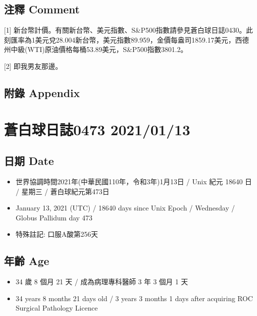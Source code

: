 \documentclass[a5paper, 10pt
]{book}
\providecommand{\tightlist}{%
  \setlength{\itemsep}{0pt}\setlength{\parskip}{0pt}}
\begin{document}
\hypertarget{ux6ce8ux91cb-comment-42}{%
\subsection{注釋 Comment}\label{ux6ce8ux91cb-comment-42}}

{[}1{]}
新台幣計價。有關新台幣、美元指數、S\&P500指數請參見蒼白球日誌0430。此刻匯率為1美元兌28.004新台幣，美元指數89.959，金價每盎司1859.17美元，西德州中級(WTI)原油價格每桶53.89美元，S\&P500指數3801.2。

{[}2{]} 即我男友那邊。

\hypertarget{ux9644ux9304-appendix-42}{%
\subsection{附錄 Appendix}\label{ux9644ux9304-appendix-42}}

\hypertarget{ux84bcux767dux7403ux65e5ux8a8c0473-20210113}{%
\section{蒼白球日誌0473
2021/01/13}\label{ux84bcux767dux7403ux65e5ux8a8c0473-20210113}}

\hypertarget{ux65e5ux671f-date-43}{%
\subsection{日期 Date}\label{ux65e5ux671f-date-43}}

\begin{itemize}
\tightlist
\item
  世界協調時間2021年(中華民國110年，令和3年)1月13日 / Unix 紀元 18640 日
  / 星期三 / 蒼白球紀元第473日
\item
  January 13, 2021 (UTC) / 18640 days since Unix Epoch / Wednesday /
  Globus Pallidum day 473
\item
  特殊註記: 口服A酸第256天
\end{itemize}

\hypertarget{ux5e74ux9f61-age-43}{%
\subsection{年齡 Age}\label{ux5e74ux9f61-age-43}}

\begin{itemize}
\tightlist
\item
  34 歲 8 個月 21 天 / 成為病理專科醫師 3 年 3 個月 1 天
\item
  34 years 8 months 21 days old / 3 years 3 months 1 days after
  acquiring ROC Surgical Pathology Licence
\end{itemize}
\end{document}
